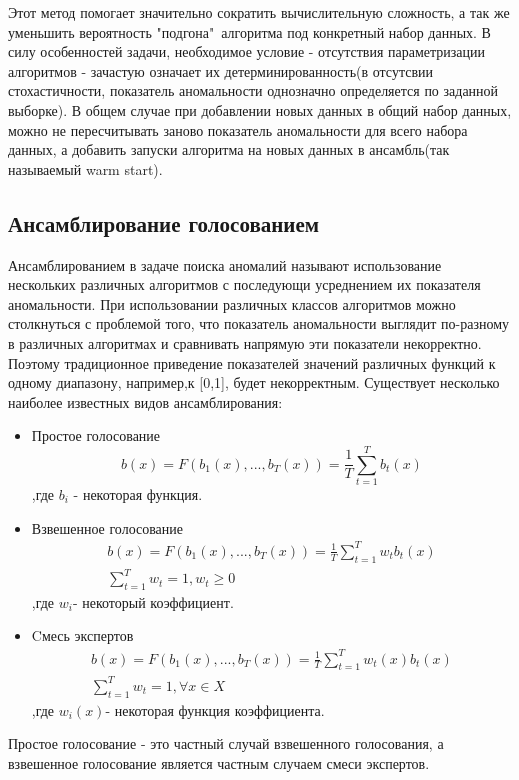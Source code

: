 Этот метод помогает значительно сократить вычислительную сложность, а так же уменьшить вероятность "подгона"\ алгоритма под конкретный набор данных.  В силу особенностей задачи, необходимое условие - отсутствия параметризации алгоритмов -  зачастую означает их детерминированность(в отсутсвии стохастичности, показатель аномальности однозначно определяется по  заданной выборке). В общем случае при добавлении новых данных в общий набор данных, можно не пересчитывать заново показатель аномальности для всего набора данных, а добавить запуски алгоритма на новых данных в ансамбль(так называемый warm start). \cite{Book15}
\subsection{Ансамблирование голосованием}
Ансамблированием в задаче поиска аномалий называют использование нескольких различных алгоритмов с последующи усреднением их показателя аномальности. При использовании различных классов алгоритмов можно столкнуться с проблемой того, что показатель аномальности выглядит по-разному в различных алгоритмах и сравнивать напрямую эти показатели некорректно.  Поэтому традиционное приведение  показателей значений различных функций к одному диапазону, например,к [0,1], будет некорректным.
Существует несколько наиболее известных видов ансамблирования:
\begin{itemize}
	\item Простое голосование 
	\begin{equation}
	b(x)=F(b_1(x),...,b_T(x))=\frac{1}{T}\sum_{t=1}^{T}b_t(x)
	\end{equation}
	,где $b_i$ -  некоторая функция.
	\item Взвешенное голосование 
	\begin{gather}
	b(x)=F(b_1(x),...,b_T(x))=\frac{1}{T}\sum_{t=1}^{T}w_tb_t(x)\\
	\sum_{t=1}^{T}w_t=1, w_t \geq 0
	\end{gather}
	,где $w_i$- некоторый коэффициент.
	\item Cмесь экспертов
	\begin{gather}
	b(x)=F(b_1(x),...,b_T(x))=\frac{1}{T}\sum_{t=1}^{T}w_t(x)b_t(x)\\
	\sum_{t=1}^{T}w_t=1, \forall x\in X
	\end{gather}
	,где $w_i(x)$- некоторая функция коэффициента.
\end{itemize}
Простое голосование - это  частный случай взвешенного голосования, а взвешенное голосование является частным случаем смеси экспертов. 

